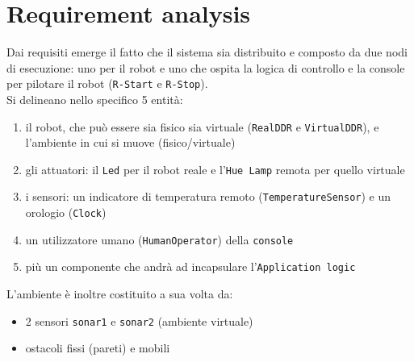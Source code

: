 \documentclass{../llncs}
\newcommand{\code}[1]{{\color{blue}\small{\texttt{#1}}}}
\newcommand{\labelsec}[1]{\label{sec:#1}}
\begin{document}
%

\section{Requirement analysis}
\labelsec{ReqAnalysis}
Dai requisiti emerge il fatto che il sistema sia distribuito e composto da due nodi di esecuzione: uno per il robot e uno che ospita la logica di controllo e la console per pilotare il robot (\code{R-Start} e \code{R-Stop}).\\

\noindent Si delineano nello specifico 5 entità:
\begin{enumerate}
\item il robot, che può essere sia fisico sia virtuale (\texttt{RealDDR} e \texttt{VirtualDDR}), e l'ambiente in cui si muove (fisico/virtuale)
\item gli attuatori: il \texttt{Led} per il robot reale e l'\texttt{Hue Lamp} remota per quello virtuale
\item i sensori: un indicatore di temperatura remoto (\texttt{TemperatureSensor}) e un orologio (\texttt{Clock})
\item un utilizzatore umano (\texttt{HumanOperator}) della \code{console}
\item più un componente che andrà ad incapsulare l'\texttt{Application logic}
\end{enumerate}

\noindent L'ambiente è inoltre costituito a sua volta da:
\begin{itemize}[label={--}]
\item 2 sensori \code{sonar1} e \code{sonar2} (ambiente virtuale)
\item ostacoli fissi (pareti) e mobili
\end{itemize}
\end{document}
